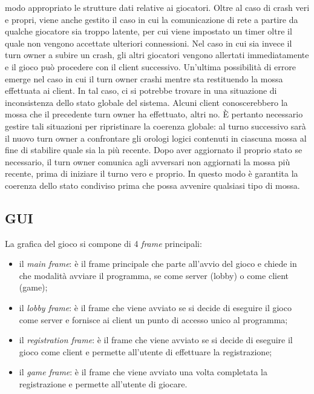 modo appropriato le strutture dati relative ai giocatori. Oltre al caso di crash 
veri e propri, viene anche gestito il caso in cui la comunicazione di rete a 
partire da qualche giocatore sia troppo latente, per cui viene impostato un 
timer oltre il quale non vengono accettate ulteriori connessioni.
Nel caso in cui sia invece il turn owner a subire un crash, gli altri giocatori 
vengono allertati immediatamente e il gioco può procedere con il client 
successivo.
Un'ultima possibilità di errore emerge nel caso in cui il turn owner crashi 
mentre sta restituendo la mossa effettuata ai client. In tal caso, ci 
si potrebbe trovare in una situazione di inconsistenza dello stato globale del 
sistema. Alcuni client conoscerebbero la mossa che il precedente turn owner ha 
effettuato, altri no. È pertanto necessario gestire tali situazioni per 
ripristinare la coerenza globale: al turno successivo sarà il nuovo turn owner 
a confrontare gli orologi logici contenuti in ciascuna mossa al fine di 
stabilire quale sia la più recente. Dopo aver aggiornato il proprio stato se 
necessario, il turn owner comunica agli avversari non aggiornati la mossa più 
recente, prima di iniziare il turno vero e proprio. In questo modo è garantita 
la coerenza dello stato condiviso prima che possa avvenire qualsiasi tipo di 
mossa.



\subsection{GUI}
La grafica del gioco si compone di 4 \textit{frame} principali:
\begin{itemize}
	\item il \textit{main frame}: è il frame principale che parte all'avvio del
	gioco e chiede in che modalità avviare il programma, se come server (lobby)
	o come client (game);
	\item il \textit{lobby frame}: è il frame che viene avviato se si decide di
	eseguire il gioco come server e fornisce ai client un punto di accesso unico
	al programma;
	\item il \textit{registration frame}: è il frame che viene avviato se si
	decide di eseguire il gioco come client e permette all'utente di effettuare
	la registrazione;
	\item il \textit{game frame}: è il frame che viene avviato una volta
	completata la registrazione e permette all'utente di giocare.
\end{itemize}

